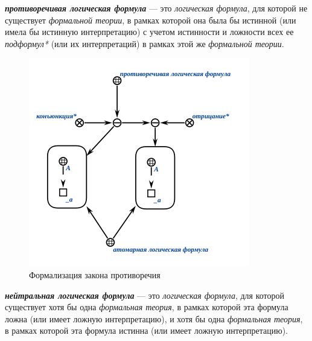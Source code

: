\begin{SCn}
\end{SCn}
\textbf{\textit{противоречивая логическая формула}} --- это \textit{логическая формула}, для которой не существует \textit{формальной теории}, в рамках которой она была бы истинной (или имела бы истинную интерпретацию) с учетом истинности и ложности всех ее \textit{подформул*} (или их интерпретаций) в рамках этой же \textit{формальной теории}.

\begin{figure}[H]
	\includegraphics[scale=0.8]{author/part2/figures/logic/contradiction_formula.png}
	\caption{Формализация закона противоречия}
	\label{fig:contradiction_formula}
\end{figure}

\begin{SCn}
\end{SCn}

\textbf{\textit{нейтральная логическая формула}} --- это \textit{логическая формула}, для которой существует хотя бы одна \textit{формальная теория}, в рамках которой эта формула ложна (или имеет ложную интерпретацию), и хотя бы одна \textit{формальная теория}, в рамках которой эта формула истинна (или имеет ложную интерпретацию).

